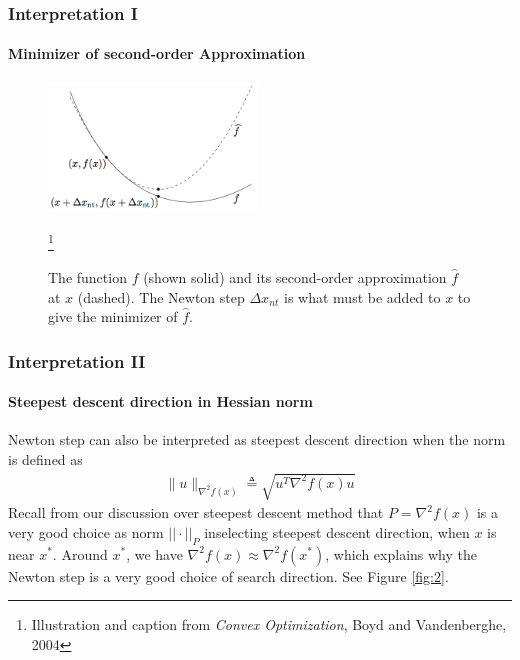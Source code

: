 \documentclass{beamer}
\begin{document}
\begin{frame}
\frametitle{Interpretation I}
\framesubtitle{Minimizer of second-order Approximation}
\begin{figure}
\includegraphics[width=2.2in]{minimizer.png}
\caption{
The function $f$ (shown solid) and its second-order approximation
$\hat{f}$ at $x$ (dashed). The Newton step $\Delta x_{nt}$ is what must be added to $x$ to
give the minimizer of $\hat{f}$.
}
\label{fig:1}
\footnote{ \tiny
    Illustration and caption from \textit{Convex Optimization},  Boyd and Vandenberghe, 2004}
\end{figure}
\end{frame}
\begin{frame}
\frametitle{Interpretation II}
\framesubtitle{Steepest descent direction in Hessian norm}
    Newton step can also be interpreted as 
    steepest descent direction when the norm is defined as
    \begin{align}
        \| u \|_{\nabla^2 f(x)} \triangleq \sqrt{u^T \nabla^2 f(x) u}
    \end{align}
    Recall from our discussion over steepest descent method that 
    $ P = \nabla^2 f(x)$ is a very good choice as norm $||\cdot||_P$ inselecting
    steepest descent direction, when $x$ is near $x^{*}$. Around $x^{*}$, we have $\nabla^2
    f(x) \approx \nabla^2 f(x^{*})$, which explains why the Newton step is a
    very good choice of search direction. See Figure \ref{fig:2}.
\end{frame}
\end{document}
